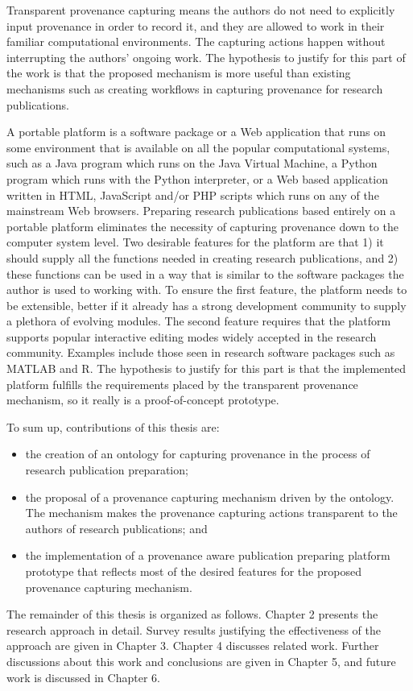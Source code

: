 Transparent provenance capturing means the authors do not need to explicitly input provenance in order to record it, and they are allowed to work in their familiar computational environments. The capturing actions happen without interrupting the authors' ongoing work. The hypothesis to justify for this part of the work is that the proposed mechanism is more useful than existing mechanisms such as creating workflows in capturing provenance for research publications.

A portable platform is a software package or a Web application that runs on some environment that is available on all the popular computational systems, such as a Java program which runs on the Java Virtual Machine, a Python program which runs with the Python interpreter, or a Web based application written in HTML, JavaScript and/or PHP scripts which runs on any of the mainstream Web browsers. Preparing research publications based entirely on a portable platform eliminates the necessity of capturing provenance down to the computer system level. Two desirable features for the platform are that 1) it should supply all the functions needed in creating research publications, and 2) these functions can be used in a way that is similar to the software packages the author is used to working with. To ensure the first feature, the platform needs to be extensible, better if it already has a strong development community to supply a plethora of evolving modules. The second feature requires that the platform supports popular interactive editing modes widely accepted in the research community. Examples include those seen in research software packages such as MATLAB and R. The hypothesis to justify for this part is that the implemented platform fulfills the requirements placed by the transparent provenance mechanism, so it really is a proof-of-concept prototype. 

To sum up, contributions of this thesis are:
\begin{itemize}
\item the creation of an ontology for capturing provenance in the process of research publication preparation;
\item the proposal of a provenance capturing mechanism driven by the ontology. The mechanism makes the provenance capturing actions transparent to the authors of research publications; and 
\item the implementation of a provenance aware publication preparing platform prototype that reflects most of the desired features for the proposed provenance capturing mechanism.
\end{itemize}

The remainder of this thesis is organized as follows. Chapter 2 presents the research approach in detail. Survey results justifying the effectiveness of the approach are given in Chapter 3. Chapter 4 discusses related work. Further discussions about this work and conclusions are given in Chapter 5, and future work is discussed in Chapter 6.

